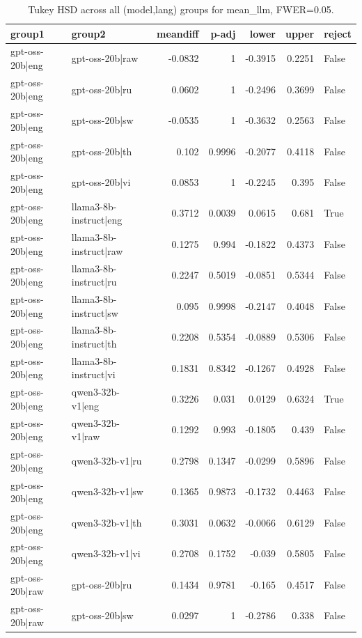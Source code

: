 \begin{table}
\caption{Tukey HSD across all (model,lang) groups for mean_llm, FWER=0.05.}
\label{tab:tukey_all_models_all_langs_mean_llm}
\begin{tabular}{l l r r r r l}
\toprule
group1 & group2 & meandiff & p-adj & lower & upper & reject \\
\midrule
gpt-oss-20b|eng & gpt-oss-20b|raw & -0.0832 & 1 & -0.3915 & 0.2251 & False \\
gpt-oss-20b|eng & gpt-oss-20b|ru & 0.0602 & 1 & -0.2496 & 0.3699 & False \\
gpt-oss-20b|eng & gpt-oss-20b|sw & -0.0535 & 1 & -0.3632 & 0.2563 & False \\
gpt-oss-20b|eng & gpt-oss-20b|th & 0.102 & 0.9996 & -0.2077 & 0.4118 & False \\
gpt-oss-20b|eng & gpt-oss-20b|vi & 0.0853 & 1 & -0.2245 & 0.395 & False \\
gpt-oss-20b|eng & llama3-8b-instruct|eng & 0.3712 & 0.0039 & 0.0615 & 0.681 & True \\
gpt-oss-20b|eng & llama3-8b-instruct|raw & 0.1275 & 0.994 & -0.1822 & 0.4373 & False \\
gpt-oss-20b|eng & llama3-8b-instruct|ru & 0.2247 & 0.5019 & -0.0851 & 0.5344 & False \\
gpt-oss-20b|eng & llama3-8b-instruct|sw & 0.095 & 0.9998 & -0.2147 & 0.4048 & False \\
gpt-oss-20b|eng & llama3-8b-instruct|th & 0.2208 & 0.5354 & -0.0889 & 0.5306 & False \\
gpt-oss-20b|eng & llama3-8b-instruct|vi & 0.1831 & 0.8342 & -0.1267 & 0.4928 & False \\
gpt-oss-20b|eng & qwen3-32b-v1|eng & 0.3226 & 0.031 & 0.0129 & 0.6324 & True \\
gpt-oss-20b|eng & qwen3-32b-v1|raw & 0.1292 & 0.993 & -0.1805 & 0.439 & False \\
gpt-oss-20b|eng & qwen3-32b-v1|ru & 0.2798 & 0.1347 & -0.0299 & 0.5896 & False \\
gpt-oss-20b|eng & qwen3-32b-v1|sw & 0.1365 & 0.9873 & -0.1732 & 0.4463 & False \\
gpt-oss-20b|eng & qwen3-32b-v1|th & 0.3031 & 0.0632 & -0.0066 & 0.6129 & False \\
gpt-oss-20b|eng & qwen3-32b-v1|vi & 0.2708 & 0.1752 & -0.039 & 0.5805 & False \\
gpt-oss-20b|raw & gpt-oss-20b|ru & 0.1434 & 0.9781 & -0.165 & 0.4517 & False \\
gpt-oss-20b|raw & gpt-oss-20b|sw & 0.0297 & 1 & -0.2786 & 0.338 & False \\

\end{tabular}
\end{table}
